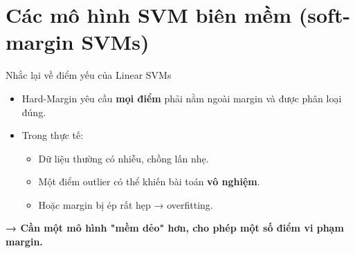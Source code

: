 \section{Các mô hình SVM biên mềm (soft-margin SVMs)}

\begin{frame}{Nhắc lại về điểm yếu của Linear SVMs}
  \begin{itemize}
    \item Hard-Margin yêu cầu \textbf{mọi điểm} phải nằm ngoài margin và được phân loại đúng.
    \item Trong thực tế:
      \begin{itemize}
        \item Dữ liệu thường có nhiễu, chồng lấn nhẹ.
        \item Một điểm outlier có thể khiến bài toán \textbf{vô nghiệm}.
        \item Hoặc margin bị ép rất hẹp → overfitting.
      \end{itemize}
  \end{itemize}
  \vspace{0.3cm}
  \centering
  \textbf{→ Cần một mô hình "mềm dẻo" hơn, cho phép một số điểm vi phạm margin.}
\end{frame}


